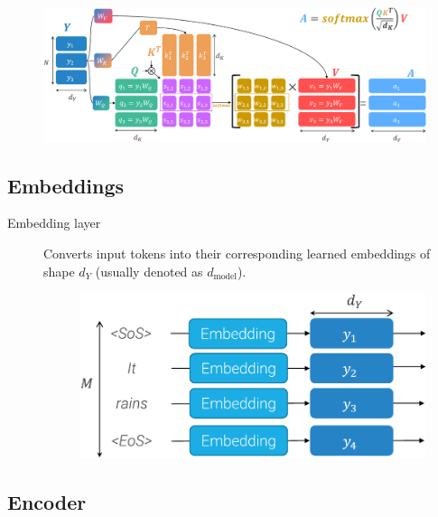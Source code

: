 \begin{description}
        \begin{figure}[H]
            \centering
            \includegraphics[width=0.8\linewidth]{./img/_self_attention.pdf}
        \end{figure}
\end{description}


\subsection{Embeddings}

\begin{description}
    \item[Embedding layer] 
        Converts input tokens into their corresponding learned embeddings of shape $d_Y$ (usually denoted as $d_\text{model}$).

        \begin{figure}[H]
            \centering
            \includegraphics[width=0.4\linewidth]{./img/_transformer_embeddings.pdf}
        \end{figure}
\end{description}


\subsection{Encoder}

